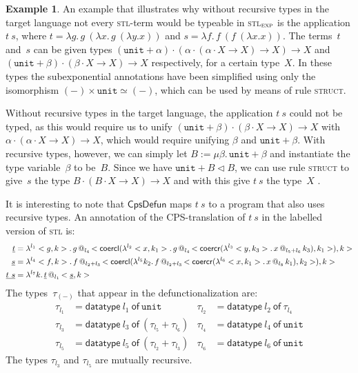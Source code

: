 \documentclass{LMCS}
\makeatletter
\theoremstyle{definition}
\newtheorem{example}[thm]{Example}
\theoremstyle{plain}
\newcommand{\lollipop}{\to}
\newcommand{\kw}[1]{\mathsf{#1}}
\newcommand{\unit}{\mathtt{unit}}
\newcommand{\R}[1]{\textsc{#1}}
\newcommand{\tappl}[3]{{#1} {\,@_{#2}\,} {#3}}
\newcommand{\cps}[1]{\underline{#1}}
\newcommand{\iso}{\simeq}
\newcommand{\stlexp}{\textsc{stl}$_\textsc{exp}$\xspace}
\makeatother
\begin{document}
\begin{example}
  \label{ex:rec}
An example that illustrates why without recursive types in the target 
language not every \textsc{stl}-term would be typeable in \stlexp
is the application $t\ s$, where
$t=\lambda g.\, g\ (\lambda x.\, g\ (\lambda y.x))$
and
$s=\lambda f.\, f\ (f\ (\lambda x.x))$.
The terms~$t$ and~$s$ can be
given types
$(\unit +\alpha)\cdot (\alpha\cdot(\alpha\cdot X \lollipop X) \lollipop X) \lollipop X$
and
$(\unit+\beta)\cdot (\beta\cdot X \lollipop X) \lollipop X$
respectively, for a certain type~$X$.
In these types the subexponential annotations have been simplified
using only the isomorphism $(-)\times \unit \iso (-)$, which can be used by
means of rule \R{struct}.

Without recursive types in the target language, the application $t\ s$
could not be typed, as this would require us to unify
$(\unit +\beta)\cdot (\beta\cdot X \lollipop X) \lollipop X$
with
$\alpha\cdot(\alpha\cdot X \lollipop X) \lollipop X$,
which would require unifying $\beta$ and $\unit +\beta$. 
With recursive types, however, we can simply
let $B := \mu \beta.\,\unit +\beta$ and instantiate the type
variable~$\beta$ to be~$B$.
Since we have $\unit + B \lhd B$, we can 
use rule \R{struct} to give~$s$ the type
$B\cdot (B\cdot X \lollipop X) \lollipop X$
and with this give $t\ s$ the type~$X$ .

It is interesting to note that $\kw{CpsDefun}$ maps $t\ s$ to a 
program that also uses recursive types.
An annotation of the CPS-translation of $t\ s$ in the labelled version
of \textsc{stl} is:
\begin{align*}
    \cps t &= \lambda^{l_1}<g,k>.\, 
      \tappl g {l_4} 
      {<\coercl{}{\lambda^{l_2}<x,k_1>.\, \tappl g {l_4} {<\coercr{}{\lambda^{l_3}<y, k_3>.\, \tappl x {l_5+l_6} {k_3}}, k_1>}}, k>}
  \\
  \cps s &= \lambda^{l_4} <f,k>.\, 
     \tappl f {l_2+l_3} 
     { <\coercl{}{\lambda^{l_5} k_2 .\, \tappl f {l_2+l_3} {<\coercr{}{\lambda^{l_6} <x, k_1>.\, \tappl x {l_8} {k_1}}, k_2>}}, 
           k> }           
  \\
  \cps{t\ s} &= \lambda^{l_7} k.\, \tappl{\cps t} {l_1} {<\cps s, k>}
\end{align*}
The types~$\tau_{(-)}$ that appear in the defunctionalization are:
\begin{align*}
  \tau_{l_1} &= \kw{datatype}\ l_1\ \kw{of}\ \unit 
  &
  \tau_{l_2} &= \kw{datatype}\ l_2\ \kw{of}\ \tau_{l_4} \\
  \tau_{l_3} &= \kw{datatype}\ l_3\ \kw{of}\ (\tau_{l_5} + \tau_{l_6}) 
  &
  \tau_{l_4} &= \kw{datatype}\ l_4\ \kw{of}\ \unit \\
  \tau_{l_5} &= \kw{datatype}\ l_5\ \kw{of}\ (\tau_{l_2} + \tau_{l_3})  
  &
  \tau_{l_6} &= \kw{datatype}\ l_6\ \kw{of}\ \unit
\end{align*}
The types $\tau_{l_3}$ and $\tau_{l_5}$ are mutually recursive.


\end{example}
\end{document}
